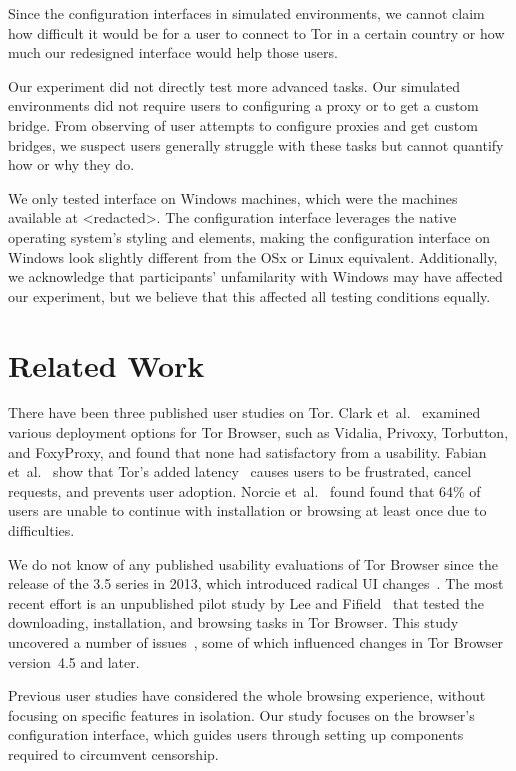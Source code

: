 \documentclass[USenglish,oneside,twocolumn]{article}
\begin{document}
Since the configuration interfaces in simulated environments, we cannot claim how difficult it would be for a user to connect to Tor in a certain country or how much our redesigned interface would help those users.  

Our experiment did not directly test more advanced tasks. Our simulated environments did not require users to configuring a proxy or to get a custom bridge. From observing of user attempts to configure proxies and get custom bridges, we suspect users generally struggle with these tasks but cannot quantify how or why they do. 

We only tested interface on Windows machines, which were the machines available at <redacted>. %
The configuration interface leverages the native operating system's styling and elements, making the configuration interface on Windows look slightly different from the OSx or Linux equivalent. Additionally, we acknowledge that participants' unfamilarity with Windows may have affected our experiment, but we believe that this affected all testing conditions equally.  

\section{Related Work}
\label{sec:related} 

{\color {red} 
There have been three published user studies on Tor. Clark et~al.~\cite{clark2007usability} examined various deployment
options for Tor Browser, such as Vidalia, Privoxy, Torbutton, and FoxyProxy, and found that none had satisfactory from a usability. Fabian et~al.~\cite{fabian2010privately} show that Tor's added
latency~\cite{dingledine2009performance} causes users
to be frustrated, cancel requests, and prevents user adoption. 
Norcie et~al.~\cite{norcie2012eliminating} found found that 
64\% of users are unable to continue with installation or browsing at least once due to difficulties.

We do not know of any published usability evaluations of
Tor Browser since the release of the 3.5 series in 2013, which introduced radical UI changes~\cite{torbrowser-35}.
The most recent effort is an unpublished pilot study by Lee and Fifield~\cite{uxsprint} 
that tested the downloading, installation, and browsing tasks in Tor Browser.  This study uncovered a number of issues~\cite{uxsprint2015-tickets},
some of which influenced changes in Tor Browser version~4.5 and later.

Previous user studies have considered the whole browsing experience,
without focusing on specific features in isolation.
Our study focuses on 
the browser's configuration interface, which guides users through setting up components required to circumvent censorship. 
}
\end{document}
